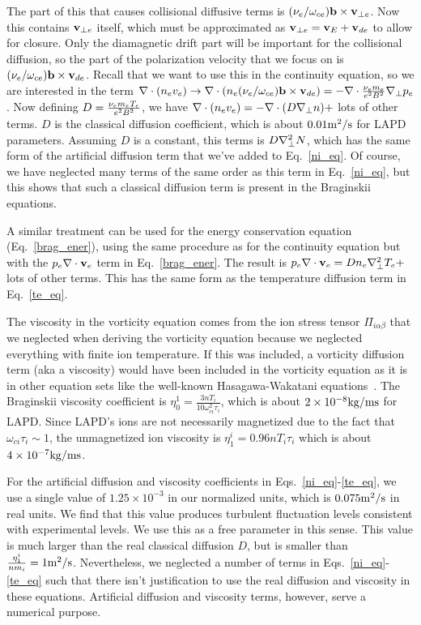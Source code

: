 The part of this that causes collisional diffusive terms is $ (\nu_{e}/\omega_{ce}) {\bf b \times v}_{\perp e}$. Now this contains ${\bf v}_{\perp e}$ itself, which must be approximated as 
${\bf v}_{\perp e} = {\bf v}_{E} + {\bf v}_{d e}$ to allow for closure. Only the diamagnetic drift part will be important for the collisional diffusion, so the part of the polarization velocity that we
focus on is $(\nu_{e}/\omega_{ce}) {\bf b \times v}_{d e}$. Recall that we want to use this in the continuity equation, so we are interested in the term 
$\nabla \cdot (n_e v_e) \rightarrow \nabla \cdot \left( n_e (\nu_{e}/\omega_{ce}) {\bf b \times v}_{d e} \right) = - \nabla \cdot \frac{\nu_{e} m_e}{e^2 B^2} \nabla_\perp p_e$. Now defining 
$D = \frac{\nu_{e} m_e T_e}{e^2 B^2}$, we have $\nabla \cdot (n_e v_e) = - \nabla \cdot (D \nabla_\perp n) +$ lots of other terms. $D$ is the classical diffusion coefficient, which is about $0.01 {\rm m^2/s}$
for LAPD parameters. Assuming $D$ is a constant, this terms is $D \nabla_\perp^2 N$, which has the same form of the artificial diffusion term that we've added to Eq.~\ref{ni_eq}. Of course, we have
neglected many terms of the same order as this term in Eq.~\ref{ni_eq}, but this shows that such a classical diffusion term is present in the Braginskii equations.

A similar treatment can be used for the energy conservation equation (Eq.~\ref{brag_ener}), using the same procedure as for the continuity equation but with the $p_e \nabla \cdot {\bf v}_e$ term in
Eq.~\ref{brag_ener}. The result is $p_e \nabla \cdot {\bf v}_e = D n_e \nabla_\perp^2 T_e +$ lots of other terms. This has the same form as the temperature diffusion term in Eq.~\ref{te_eq}.

The viscosity in the vorticity equation comes from the ion stress tensor $\Pi_{i \alpha \beta}$ that we neglected when deriving the vorticity equation because we neglected everything with finite
ion temperature. If this was included, a vorticity diffusion term (aka a viscosity) would have been included in the vorticity equation as it is in other equation sets like the well-known
Hasagawa-Wakatani equations~\cite{hasegawa1983}. The Braginskii viscosity coefficient is $\eta_0^1 = \frac{3 n T_i}{10 \omega_{ci}^2 \tau_i}$, which is about $2 \times 10^{-8} { \rm kg/m s}$ for LAPD. 
Since LAPD's ions are not necessarily magnetized due to the fact that $\omega_{ci} \tau_i \sim 1$, the unmagnetized ion viscosity is $\eta_1^i = 0.96 n T_i \tau_i$ which is about
$4 \times 10^{-7} {\rm kg/m s}$.

For the artificial diffusion and viscosity coefficients in Eqs.~\ref{ni_eq}-\ref{te_eq}, we use a single value of $1.25 \times 10^{-3}$ in our normalized units, 
which is $0.075 {\rm m^2/s}$ in real units.
We find that this value produces turbulent fluctuation levels consistent with experimental levels. 
We use this as a free parameter in this sense. This value is much larger than the real classical diffusion $D$,
but is smaller than $\frac{\eta_1^i}{n m_i} = 1 {\rm m^2/s}$. 
Nevertheless, we neglected a number of terms in Eqs.~\ref{ni_eq}-\ref{te_eq} such that there isn't justification to use the real diffusion and 
viscosity in these equations. Artificial diffusion and viscosity terms, however, serve a numerical purpose.


